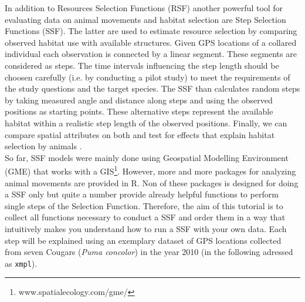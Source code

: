 \documentclass[11pt, a4paper]{article} %
\begin{document}
In addition to Resources Selection Functions (RSF) another powerful tool for evaluating data on animal movements and habitat selection are Step Selection Functions (SSF). The latter are used to estimate resource selection by comparing observed habitat use with available structures. Given GPS locations of a collared individual each observation is connected by a linear segment. These segments are considered as steps. The time intervals influencing the step length should be choosen carefully (i.e. by conducting a pilot study) to meet the requirements of the study questions and the target species. The SSF than calculates random steps by taking measured angle and distance along steps and using the observed positions as starting points. These alternative steps represent the available habitat within a realistic step length of the observed positions. Finally, we can compare spatial attributes on  both and test for effects that explain habitat selection by animals \cite{thurfjell2014applications}.\\ So far, SSF models were mainly done using Geospatial Modelling Environment (GME) that works with a GIS\footnote{www.spatialecology.com/gme/}. However, more and more packages for analyzing animal movements are provided in R. Non of these packages is designed for doing a SSF only but quite a number provide already helpful functions to perform single steps of the Selection Function. Therefore, the aim of this tutorial is to collect all functions necessary to conduct a SSF and order them in a  way that intuitively makes you understand how to run a SSF with your own data. Each step will be explained using an exemplary dataset of GPS locations collected from seven Cougars (\textit{Puma concolor}) in the year 2010 (in the following adressed as \texttt{xmpl}).\\
\end{document}
